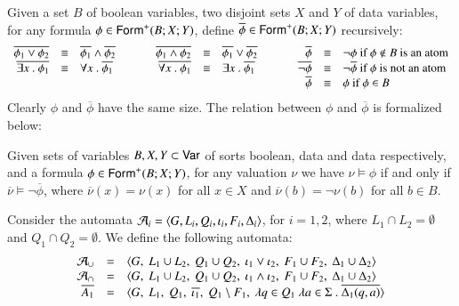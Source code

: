 \documentclass{llncs}
\begin{document}
Given a set $B$ of boolean variables, two disjoint sets $X$ and $Y$ of
data variables, for any formula $\phi \in \mathsf{Form}^+(B;X;Y)$,
define $\overline{\phi} \in \mathsf{Form}^+(B;X;Y)$ recursively:
\[\begin{array}{rclcrclcrcl}
\overline{\phi_1 \vee \phi_2} & \equiv & \overline{\phi_1} \wedge \overline{\phi_2} & \hspace*{5mm} & 
\overline{\phi_1 \wedge \phi_2} & \equiv & \overline{\phi_1} \vee \overline{\phi_2} & \hspace*{5mm} & 
\overline{\phi} & \equiv & \neg\phi \text{ if $\phi \not\in B$ is an atom} \\ 
\overline{\exists x ~.~ \phi_1} & \equiv & \forall x ~.~ \overline{\phi_1} && 
\overline{\forall x ~.~ \phi_1} & \equiv & \exists x ~.~ \overline{\phi_1} && 
\overline{\neg\phi} & \equiv & \neg \overline{\phi} \text{ if $\phi$ is not an atom} \\
&& && && && \overline{\phi} & \equiv & \phi \text{ if $\phi \in B$}
\end{array}\]
Clearly $\phi$ and $\overline{\phi}$ have the same size. The relation
between $\phi$ and $\overline{\phi}$ is formalized below:

\begin{proposition}\label{prop:complement}
  Given sets of variables $B,X,Y \subset \mathsf{Var}$ of sorts boolean, data
  and data respectively, and a formula $\phi \in
  \mathsf{Form}^+(B;X;Y)$, for any valuation $\nu$ we have $\nu \models
  \phi$ if and only if $\overline{\nu} \models \neg\overline{\phi}$,
  where $\overline{\nu}(x) = \nu(x)$ for all $x \in X$ and
  $\overline{\nu}(b) = \neg\nu(b)$ for all $b \in B$.
\end{proposition}

Consider the automata $\mathcal{A}_i = \langle G,L_i,Q_i,\iota_i,F_i,\Delta_i \rangle$,
for $i=1,2$, where $L_1 \cap L_2 = \emptyset$ and $Q_1 \cap Q_2 =
\emptyset$. We define the following automata: 
\[\begin{array}{rcl}
\mathcal{A}_\cup & = & \langle G,~ L_1 \cup L_2,~ Q_1 \cup Q_2,~ \iota_1 \vee \iota_2,~ F_1 \cup F_2,~ \Delta_1 \cup \Delta_2 \rangle \\
\mathcal{A}_\cap & = & \langle G,~ L_1 \cup L_2,~ Q_1 \cup Q_2,~ \iota_1 \wedge \iota_2,~ F_1 \cup F_2,~ \Delta_1 \cup \Delta_2 \rangle \\
\overline{A_1} & = & \langle G,~ L_1,~ Q_1,~ \overline{\iota_1},~ Q_1 \setminus F_1,~ \lambda q \in Q_1~ \lambda a \in \Sigma ~.~ \overline{\Delta_1(q,a)} \rangle
\end{array}\]
\end{document}
